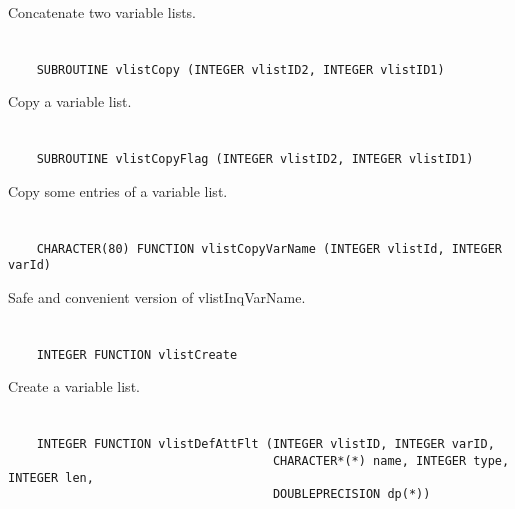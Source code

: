 Concatenate two variable lists.


\section*{\tt {}}

\begin{verbatim}
    SUBROUTINE vlistCopy (INTEGER vlistID2, INTEGER vlistID1)
\end{verbatim}

Copy a variable list.


\section*{\tt {}}

\begin{verbatim}
    SUBROUTINE vlistCopyFlag (INTEGER vlistID2, INTEGER vlistID1)
\end{verbatim}

Copy some entries of a variable list.


\section*{\tt {}}

\begin{verbatim}
    CHARACTER(80) FUNCTION vlistCopyVarName (INTEGER vlistId, INTEGER varId)
\end{verbatim}

Safe and convenient version of vlistInqVarName.


\section*{\tt {}}

\begin{verbatim}
    INTEGER FUNCTION vlistCreate
\end{verbatim}

Create a variable list.


\section*{\tt {}}

\begin{verbatim}
    INTEGER FUNCTION vlistDefAttFlt (INTEGER vlistID, INTEGER varID,
                                     CHARACTER*(*) name, INTEGER type, INTEGER len,
                                     DOUBLEPRECISION dp(*))
\end{verbatim}

